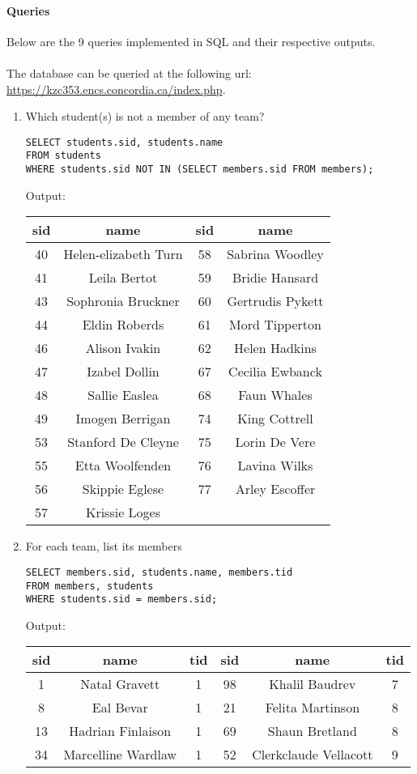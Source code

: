 \documentclass[11pt,letterpaper]{article}
\begin{document}
\paragraph{Queries} Below are the 9 queries implemented in SQL and their respective outputs.\\
\\
The database can be queried at the following url: \url{https://kzc353.encs.concordia.ca/index.php}.
\begin{enumerate}

\item Which student(s) is not a member of any team?
\begin{verbatim}
SELECT students.sid, students.name
FROM students
WHERE students.sid NOT IN (SELECT members.sid FROM members);
\end{verbatim}
Output:
\begin{center}
\begin{tabular}{ | c  c | c  c | }
 \hline
 sid & name & sid & name\\
 \hline
 40 & Helen-elizabeth Turn & 58 & Sabrina Woodley \\
 41 & Leila Bertot & 59 & Bridie Hansard \\
 43 & Sophronia Bruckner & 60 & Gertrudis Pykett \\
 44 & Eldin Roberds & 61 & Mord Tipperton \\
 46 & Alison Ivakin & 62 & Helen Hadkins \\
 47 & Izabel Dollin & 67 & Cecilia Ewbanck \\
 48 & Sallie Easlea & 68 & Faun Whales \\
 49 & Imogen Berrigan & 74 & King Cottrell \\
 53 & Stanford De Cleyne & 75 & Lorin De Vere \\
 55 & Etta Woolfenden & 76 & Lavina Wilks \\
 56 & Skippie Eglese & 77 & Arley Escoffer \\
 57 & Krissie Loges &  & \\
 \hline
\end{tabular}
\end{center}

\item For each team, list its members
\begin{verbatim}
SELECT members.sid, students.name, members.tid 
FROM members, students 
WHERE students.sid = members.sid;
\end{verbatim}
Output:
\begin{center}
\begin{tabular}{ | c  c  c |  c c c | }
 \hline
 sid & name & tid & sid & name & tid \\
\hline
1 & Natal Gravett & 1 & 98 & Khalil Baudrev & 7 \\
8 & Eal Bevar & 1 & 21 & Felita Martinson & 8 \\
13 & Hadrian Finlaison & 1 & 69 & Shaun Bretland & 8 \\
34 & Marcelline Wardlaw & 1 & 52 & Clerkclaude Vellacott & 9 \\


\end{tabular}
\end{center}
\end{enumerate}
\end{document}
